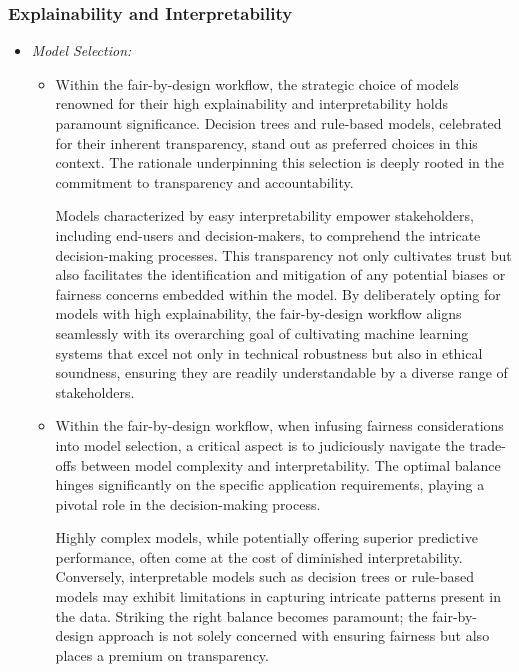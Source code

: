 \documentclass[12pt,a4paper,openright,twoside]{book}
\begin{document}
\subsubsection{Explainability and Interpretability}

\begin{itemize}

    \item \emph{Model Selection:}

    \begin{itemize}

        \item Within the fair-by-design workflow, the strategic choice of models renowned for their high explainability and interpretability holds paramount significance. Decision trees and rule-based models, celebrated for their inherent transparency, stand out as preferred choices in this context. The rationale underpinning this selection is deeply rooted in the commitment to transparency and accountability.

        Models characterized by easy interpretability empower stakeholders, including end-users and decision-makers, to comprehend the intricate decision-making processes. This transparency not only cultivates trust but also facilitates the identification and mitigation of any potential biases or fairness concerns embedded within the model. By deliberately opting for models with high explainability, the fair-by-design workflow aligns seamlessly with its overarching goal of cultivating machine learning systems that excel not only in technical robustness but also in ethical soundness, ensuring they are readily understandable by a diverse range of stakeholders.

        \item Within the fair-by-design workflow, when infusing fairness considerations into model selection, a critical aspect is to judiciously navigate the trade-offs between model complexity and interpretability. The optimal balance hinges significantly on the specific application requirements, playing a pivotal role in the decision-making process.

        Highly complex models, while potentially offering superior predictive performance, often come at the cost of diminished interpretability. Conversely, interpretable models such as decision trees or rule-based models may exhibit limitations in capturing intricate patterns present in the data. Striking the right balance becomes paramount; the fair-by-design approach is not solely concerned with ensuring fairness but also places a premium on transparency.
        

\end{itemize}
\end{itemize}
\end{document}
